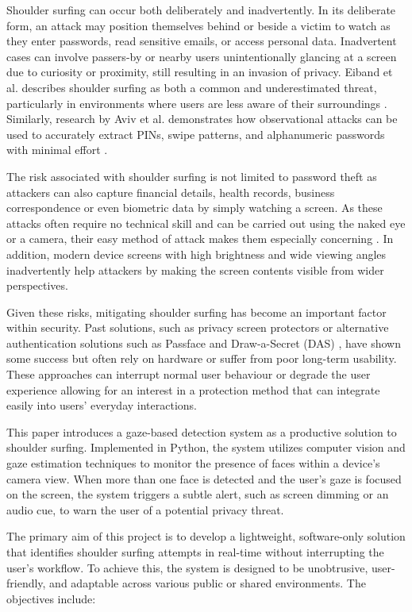 \documentclass[12pt]{article}
\theoremstyle{plain}
\theoremstyle{definition}
\begin{document}
Shoulder surfing can occur both deliberately and inadvertently. In its deliberate form, an attack may position themselves behind or beside a victim to watch as they enter passwords, read sensitive emails, or access personal data. Inadvertent cases can involve passers-by or nearby users unintentionally glancing at a screen due to curiosity or proximity, still resulting in an invasion of privacy. Eiband et al. describes shoulder surfing as both a common and underestimated threat, particularly in environments where users are less aware of their surroundings \cite{eiband_understanding_2017}. Similarly, research by Aviv et al. demonstrates how observational attacks can be used to accurately extract PINs, swipe patterns, and alphanumeric passwords with minimal effort \cite{aviv_towards_2017}.

The risk associated with shoulder surfing is not limited to password theft as attackers can also capture financial details, health records, business correspondence or even biometric data by simply watching a screen. As these attacks often require no technical skill and can be carried out using the naked eye or a camera, their easy method of attack makes them especially concerning \cite{block_impact_2010}. In addition, modern device screens with high brightness and wide viewing angles inadvertently help attackers by making the screen contents visible from wider perspectives.

Given these risks, mitigating shoulder surfing has become an important factor within security. Past solutions, such as privacy screen protectors or alternative authentication solutions such as Passface \cite{liu_passface_2021} and Draw-a-Secret (DAS) \cite{nali_analyzing_2004}, have shown some success but often rely on hardware or suffer from poor long-term usability. These approaches can interrupt normal user behaviour or degrade the user experience allowing for an interest in a protection method that can integrate easily into users’ everyday interactions.

This paper introduces a gaze-based detection system as a productive solution to shoulder surfing. Implemented in Python, the system utilizes computer vision and gaze estimation techniques to monitor the presence of faces within a device’s camera view. When more than one face is detected and the user’s gaze is focused on the screen, the system triggers a subtle alert, such as screen dimming or an audio cue, to warn the user of a potential privacy threat.

The primary aim of this project is to develop a lightweight, software-only solution that identifies shoulder surfing attempts in real-time without interrupting the user’s workflow. To achieve this, the system is designed to be unobtrusive, user-friendly, and adaptable across various public or shared environments. The objectives include:
\end{document}
